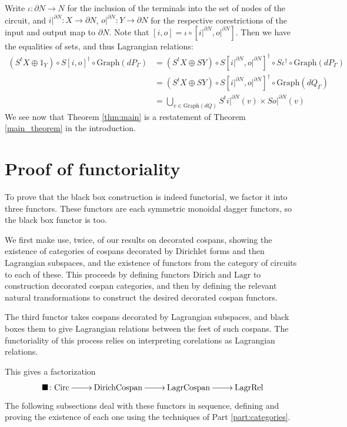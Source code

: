 Write $\iota: \partial N \to N$ for the inclusion of the terminals into the set
of nodes of the circuit, and $i\rvert^{\partial N}: X \to \partial N$,
$o\rvert^{\partial N}: Y \to \partial N$ for the respective corestrictions of
the input and output map to $\partial N$. Note that $[i,o] = \iota \circ
[i\rvert^{\partial N}, o\rvert^{\partial N}]$.
Then we have the equalities of sets, and thus Lagrangian relations:
\begin{align*}
  (S^t\!X\oplus 1_Y) \circ S[i,o]^\dagger \circ \mathrm{Graph}(dP_\Gamma)
  &= (S^t\!X\oplus SY) \circ S[i\rvert^{\partial
  N},o\rvert^{\partial N}]^\dagger \circ S\iota^\dagger \circ \mathrm{Graph}(dP_\Gamma) \\
  &= (S^t\!X\oplus SY) \circ S[i\rvert^{\partial
  N},o\rvert^{\partial N}]^\dagger \circ \mathrm{Graph}(dQ_\Gamma) \\
  &= \bigcup_{v \in \mathrm{Graph}(dQ)} S^ti\rvert^{\partial N}(v) \times
  So\rvert^{\partial N}(v)
\end{align*}
We see now that Theorem \ref{thm:main} is a restatement of Theorem
\ref{main_theorem} in the introduction.

\section{Proof of functoriality} \label{sec:proof}
To prove that the black box construction is indeed functorial, we
factor it into three functors. These functors are each symmetric monoidal dagger
functors, so the black box functor is too.

We first make use, twice, of our results on decorated cospans, showing the
existence of categories of cospans decorated by Dirichlet forms and then
Lagrangian subspaces, and the existence of functors from the category of
circuits to each of these. This proceeds by defining functors $\mathrm{Dirich}$
and $\mathrm{Lagr}$ to construction decorated cospan categories, and then by
defining the relevant natural transformations to construct the desired decorated
cospan functors.

The third functor takes cospans decorated by Lagrangian subspaces, and black
boxes them to give Lagrangian relations between the feet of such cospans. The
functoriality of this process relies on interpreting corelations as Lagrangian
relations.

This gives a factorization
\[
  \xymatrix{
    \blacksquare\maps \Circ \ar[r] & \mathrm{DirichCospan} \ar[r] &
    \mathrm{LagrCospan} \ar[r] & \LagrRel
  }
\]
The following subsections deal with these functors in sequence, defining and
proving the existence of each one using the techniques of Part
\ref{part:categories}.


